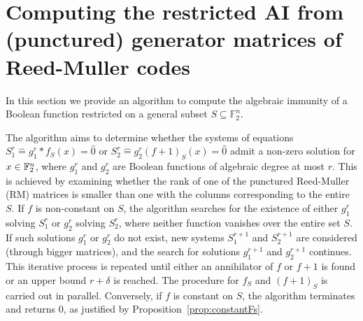 \documentclass[11pt]{llncs}
\begin{document}
\section{Computing the restricted AI from (punctured) generator matrices of Reed-Muller codes}\label{sec:RMapproach}

In this section we provide an algorithm to compute the algebraic immunity of a Boolean function restricted on a general subset $S \subseteq \mathbb{F}_2^n$. 



The algorithm aims to determine whether the systems of equations $S_1^r \hat{=}g_1^r*f_S (x)= \hat{0}$ or $S_2^r\hat{=}g_2^r (f+ 1)_S (x) = \hat{0}$ admit a non-zero solution for $x \in \mathbb{F}_2^n$, where $g_1^r$ and $ g_2^r$ are Boolean functions of algebraic degree at most $ r$. 
This is achieved by examining whether the rank of one of the punctured Reed-Muller (RM) matrices is smaller than one with the columns corresponding to the entire $S$.
If $f$ is non-constant on $S$, the algorithm searches for the existence of either $g_1^r$ solving $S_1^r$ or $g_2^r$ solving $S_2^r$, where neither function vanishes over the entire set \( S \). 
If such solutions \( g_1^r \) or \( g_2^r \) do not exist, new systems \( S_1^{r+1} \) and \( S_2^{r+1} \) are considered (through bigger matrices), and the search for solutions \( g_1^{r+1} \) and \( g_2^{r+1} \) continues. This iterative process is repeated until either an annihilator of \( f \) or \( f + 1 \) is found or an upper bound \( r + \delta \) is reached. The procedure for \( f_S \) and \( (f + 1)_S \) is carried out in parallel.
Conversely, if \( f \) is constant on \( S \), the algorithm terminates and returns \( 0 \), as justified by Proposition~\ref{prop:constantFs}. 
\end{document}
